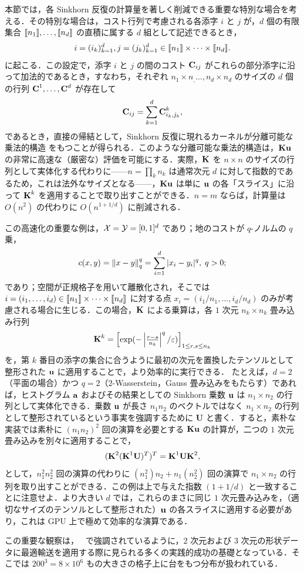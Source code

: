 \begin{rem}[分離可能なカーネルに対する高速化]\label{rem-separable} 本節では，各 Sinkhorn 反復の計算量を著しく削減できる重要な特別な場合を考える．その特別な場合は，コスト行列で考慮される各添字 $i$ と $j$ が，$d$ 個の有限集合 $\llbracket n_1\rrbracket,\dots,\llbracket n_d\rrbracket$ の直積に属する $d$ 組として記述できるとき，
$$i=(i_k)_{k=1}^d, j=(j_k)_{k=1}^d \in \llbracket n_1\rrbracket\times\dots\times\llbracket n_d\rrbracket.$$
に起こる．この設定で，添字 $i$ と $j$ の間のコスト $\mathrm{\textbf{C}}_{ij}$ がこれらの部分添字に沿って加法的であるとき，すなわち，それぞれ $n_1\times n_,\dots,n_d\times n_d$ のサイズの $d$ 個の行列 $\mathrm{\textbf{C}}^1,\dots,\mathrm{\textbf{C}}^d$ が存在して
$$\mathrm{\textbf{C}}_{ij} = \sum_{k=1}^d \mathrm{\textbf{C}}^k_{i_k,j_k},$$
であるとき，直接の帰結として，Sinkhorn 反復に現れるカーネルが分離可能な乗法的構造
をもつことが得られる．このような分離可能な乗法的構造は，$\mathrm{\textbf{K}} \mathrm{\textbf{u}}$ の非常に高速な（厳密な）評価を可能にする．実際，$\mathrm{\textbf{K}}$ を $n\times n$ のサイズの行列として実体化する代わりに——$n=\prod_k n_k$ は通常次元 $d$ に対して指数的であるため，これは法外なサイズとなる——，$\mathrm{\textbf{K}}\mathrm{\textbf{u}}$ は単に $\mathrm{\textbf{u}}$ の各「スライス」に沿って $\mathrm{\textbf{K}}^k$ を適用することで取り出すことができる．$n=m$ ならば，計算量は $O(n^2)$ の代わりに $O(n^{1+1/d})$ に削減される．
%

この高速化の重要な例は，$\mathcal{X}=\mathcal{Y}=[0,1]^d$ であり；地のコストが $q$-ノルムの $q$ 乗，$$c(x,y)=\left\| x-y \right\|^q_q=\sum_{i=1}^d |x_i-y_i|^q, \; q>0;$$ であり；空間が正規格子を用いて離散化され，そこでは $i=(i_1,\dots,i_d)\in\llbracket n_1\rrbracket\times \dots\times\llbracket n_d\rrbracket$ に対する点 $x_i = (i_1/n_1,\ldots,i_d/n_d)$ のみが考慮される場合に生じる．この場合，$\mathrm{\textbf{K}}$ による乗算は，各 $1$ 次元 $n_k\times n_k$ 畳み込み行列 $$\mathrm{\textbf{K}}^k = \begin{bmatrix}\exp(-\left|\frac{r-s}{n_k}\right|^q/ \varepsilon)\end{bmatrix}_{1 \leq r,s\leq n_k}$$ を，第 $k$ 番目の添字の集合に合うように最初の次元を置換したテンソルとして整形された $\mathrm{\textbf{u}}$ に適用することで，より効率的に実行できる．
%
たとえば，$d=2$（平面の場合）かつ $q=2$（$2$-Wasserstein，Gauss 畳み込みをもたらす）であれば，ヒストグラム $\mathrm{\textbf{a}}$ およびその結果としての Sinkhorn 乗数 $\mathrm{\textbf{u}}$ は $n_1\times n_2$ の行列として実体化できる．乗数 $\mathrm{\textbf{u}}$ が長さ $n_1n_2$ のベクトルではなく $n_1\times n_2$ の行列として整形されているという事実を強調するために $\mathbf{U}$ と書く．すると，素朴な実装では素朴に $(n_1 n_2)^2$ 回の演算を必要とする $\mathrm{\textbf{K}}\mathrm{\textbf{u}}$ の計算が，二つの $1$ 次元畳み込みを別々に適用することで，$$(\mathrm{\textbf{K}}^2(\mathrm{\textbf{K}}^1 \mathbf{U})^T)^T=\mathrm{\textbf{K}}^1\mathbf{U}\mathrm{\textbf{K}}^2,$$ として，$n_1^2n_2^2$ 回の演算の代わりに $(n_1^2)n_2+n_1(n_2^2)$ 回の演算で $n_1\times n_2$ の行列を取り出すことができる．この例は上で与えた指数 $(1+1/d)$ と一致することに注意せよ．より大きい $d$ では，これらのまさに同じ $1$ 次元畳み込みを，（適切なサイズのテンソルとして整形された）$\mathrm{\textbf{u}}$ の各スライスに適用する必要があり，これは GPU 上で極めて効率的な演算である．
%

この重要な観察は，~\citep{2015-solomon-siggraph,2016-bonneel-barycoord} で強調されているように，$2$ 次元および $3$ 次元の形状データに最適輸送を適用する際に見られる多くの実践的成功の基礎となっている．そこでは $200^3=8 \times 10^6$ もの大きさの格子上に台をもつ分布が扱われている．
\end{rem}

